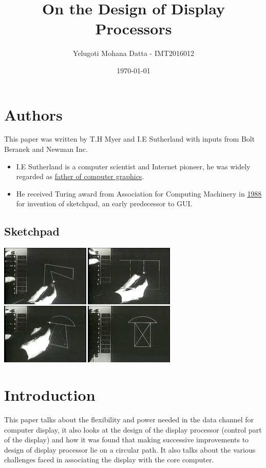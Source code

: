 \documentclass[11pt]{article}
\author{Yelugoti Mohana Datta - IMT2016012}
\date{\today}
\title{On the Design of Display Processors}
\begin{document}
\maketitle

\section{Authors}
\label{sec:orgc19242e}

This paper was written by T.H Myer and I.E Sutherland with inputs from
Bolt Beranek and Newman Inc.

\begin{itemize}
\item I.E Sutherland is a computer scientist and Internet pioneer, he was 
widely regarded as \uline{father of computer graphics}.

\item He received Turing award from Association for Computing Machinery in
\uline{1988} for invention of sketchpad, an early predecessor to GUI.
\end{itemize}

\subsection{Sketchpad}
\label{sec:org2b2c962}
\begin{center}
\includegraphics[width=.9\linewidth]{./images/spad.jpg}
\end{center}
\section{Introduction}
\label{sec:org38e7b54}

This paper talks about the flexibility and power needed in the data
channel for computer display, it also looks at the design of the 
display processor (control part of the display) and how it was 
found that making successive improvements to design of display processor
lie on a circular path. It also talks about the various challenges faced
in associating the display with the core computer.
\end{document}

